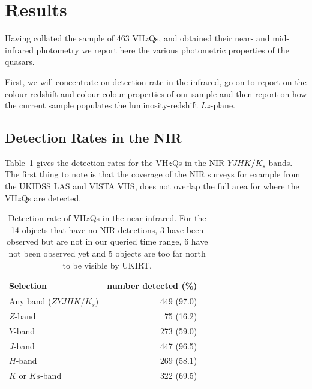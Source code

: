 \documentclass[usenatbib]{mnras}
\begin{document}
\section{Results}
Having collated the sample of 463 VH$z$Qs, and obtained their near-
and mid-infrared photometry we report here the various photometric
properties of the quasars.

First, we will concentrate on detection rate in the infrared, go on to
report on the colour-redshift and colour-colour properties of our sample
and then report on how the current sample populates the
luminosity-redshift $Lz$-plane.

\subsection{Detection Rates in the NIR}
Table~\ref{tab:nir_detection} gives the detection rates for the 
VH$z$Qs in the NIR $YJHK/K_{s}$-bands. 
The first thing to note is that the coverage of the NIR surveys 
for example from the UKIDSS LAS and VISTA VHS, does
not overlap the full area for where the VH$z$Qs are detected. 

\begin{table}
  \centering
  \begin{tabular}{l r l}
    \hline  \hline
    Selection   & number detected (\%) \\
    \hline  
    Any band ($ZYJHK/K_{s}$)    &  449  (97.0) \\
    $Z$-band                            &  75  (16.2) \\
    $Y$-band                            &  273  (59.0) \\
    $J$-band                              &  447  (96.5) \\
    $H$-band                            &  269  (58.1) \\
    $K$ or $Ks$-band                &  322  (69.5) \\
    \hline  \hline
  \end{tabular}
  \caption{Detection rate of VH$z$Qs in the near-infrared. 
For the 14 objects that have no NIR detections, 3 have 
been observed but are not in our queried time range, 6 have 
not been observed yet and 5 objects are too far north to be visible 
by UKIRT. }
  \label{tab:nir_detection}
\end{table}
\end{document}
